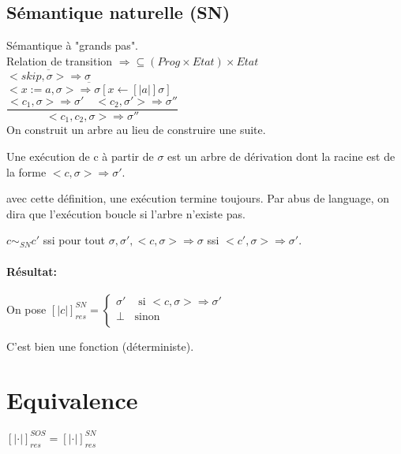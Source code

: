 \documentclass[10pt,a4paper]{article}
\newcommand{\semm}[1]{\left[| #1 | \right]}
\begin{document}
\subsection{Sémantique naturelle (SN)}
 
 Sémantique à "grands pas".\\
 Relation de transition $\Rightarrow \subseteq (Prog \times Etat) \times Etat$\\

$\overline{ <skip, \sigma > \Rightarrow \sigma }$\\

$\overline{  <x:=a , \sigma > \Rightarrow \sigma [ x \leftarrow \semm{a } \sigma ] }$\\

$\dfrac{ <c_1, \sigma > \Rightarrow \sigma' \quad <c_2 , \sigma' > \Rightarrow \sigma'' }{<c_1, c_2, \sigma > \Rightarrow \sigma''}$\\


On construit un arbre au lieu de construire une suite.
\begin{definition}[Exécution]
Une exécution de c à partir de $\sigma$ est un arbre de dérivation dont la racine est de la forme $<c, \sigma > \Rightarrow \sigma'$.
\end{definition} 
\begin{rem}
avec cette définition, une exécution termine toujours. Par abus de language, on dira que l'exécution boucle si l'arbre n'existe pas.
\end{rem}
\begin{definition}[Equivalence]
 $c \sim_{SN} c'$ ssi pour tout $\sigma, \sigma', < c, \sigma > \Rightarrow \sigma$ ssi $<c', \sigma > \Rightarrow \sigma'$.
\end{definition} 


\paragraph*{Résultat:}
On pose $\semm{c}_{res}^{SN} = \left\{ \begin{array}{ll}
 \sigma' &\text{ si } <c, \sigma > \Rightarrow \sigma' \\
 \perp & \text{sinon} \\
\end{array} \right.$

\begin{thm} C'est bien une fonction (déterministe).
\end{thm}

\section{Equivalence}
\begin{thm} $ \semm{ \cdot }_{res}^{SOS} = \semm{ \cdot }_{res}^{SN}$
\end{thm}
\end{document}
